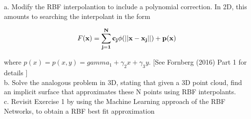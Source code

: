 a. Modify the RBF interpolantion to include a polynomial correction. In 2D, this amounts to searching
the interpolant in the form

$$F(\bf{x}) = \sum_{j=1}^Nc_j\phi(||\bf{x}-\bf{x}_j||) + p(\bf{x})$$

where $p(x) = p(x, y) = gamma_1 + \gamma_2x + \gamma_3y$. [See Fornberg (2016) Part 1 for details ]\\

b. Solve the analogous problem in 3D, stating that given a 3D point cloud, find an implicit surface
that approximates these N points using RBF interpolants.\\

c. Revisit Exercise 1 by using the Machine Learning approach of the RBF Networks, to obtain a RBF best
fit approximation\\\\